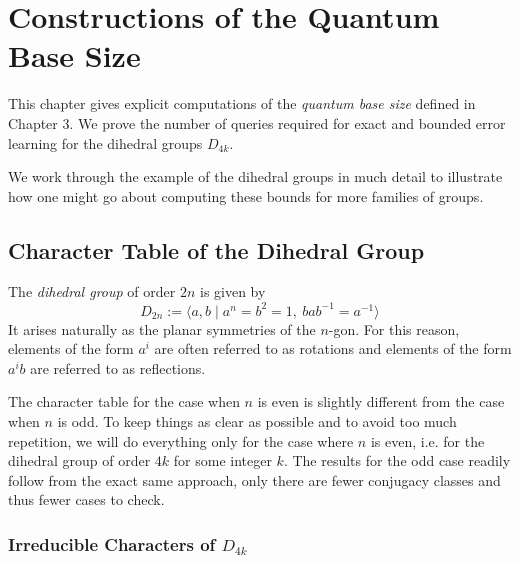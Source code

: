 
\chapter{Constructions of the Quantum Base Size}

This chapter gives explicit computations of the \emph{quantum base size} defined in Chapter 3. We prove the number 
of queries required for exact and bounded error learning for the dihedral groups $D_{4k}$.

We work through the example of the dihedral groups in much detail to illustrate how one might go about computing 
these bounds for more families of groups.

\section{Character Table of the Dihedral Group}

The \emph{dihedral group} of order $2n$ is given by
\[
    D_{2n} := \langle a,b \mid a^n = b^2 = 1,\ bab^{-1} = a^{-1} \rangle
\]
It arises naturally as the planar symmetries of the $n$-gon. For this reason, elements of the form $a^i$ are often 
referred to as rotations and elements of the form $a^ib$ are referred to as reflections.

The character table for the case when $n$ is even is slightly different from the case when $n$ is odd. To keep 
things as clear as possible and to avoid too much repetition, we will do everything only for the case where $n$ is 
even, i.e. for the dihedral group of order $4k$ for some integer $k$. The results for the odd case readily follow 
from the exact same approach, only there are fewer conjugacy classes and thus fewer cases to check.








\subsection{Irreducible Characters of $D_{4k}$}

